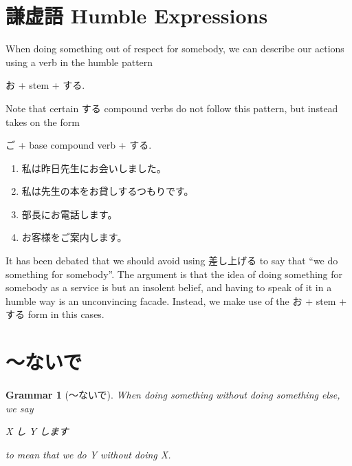 \documentclass[notoc,notitlepage]{tufte-book}
\newtheorem{grammar}{\faBook Grammar}
\begin{document}

\section{謙虚語 Humble Expressions}%
\label{sec:kenkyogo_humble_expressions}

When doing something out of respect for somebody,
we can describe our actions using a verb in the humble pattern
\begin{center}
  お + stem + する.
\end{center}
Note that certain する compound verbs do not follow this pattern,
but instead takes on the form
\begin{center}
  ご + base compound verb + する.
\end{center}

\begin{eg}
  \begin{enumerate}
    \item 私は昨日先生にお会いしました。
    \item 私は先生の本をお貸しするつもりです。
    \item 部長にお電話します。
    \item お客様をご案内します。
  \end{enumerate}
\end{eg}

\begin{warning}
  It has been debated that we should avoid using 差し上げる
  to say that ``we do something for somebody''.
  The argument is that the idea of doing something for somebody
  as a service is but an insolent belief, and having to speak
  of it in a humble way is an unconvincing facade.
  Instead, we make use of the お + stem + する form in this cases.
\end{warning}


\section{〜ないで}%
\label{sec:_naide}

\begin{grammar}[〜ないで]\label{grammar:_naide}
  When doing something without doing something else,
  we say
  \begin{center}
    X し Y します
  \end{center}
  to mean that we do Y without doing X.
\end{grammar}
\end{document}
